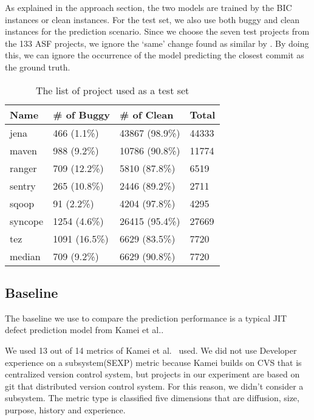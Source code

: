 As explained in the approach section, the two {\simfin} models are trained by the BIC instances or clean instances.
For the test set, we also use both buggy and clean instances for the prediction scenario.
Since we choose the seven test projects from the 133 ASF projects, we ignore the `same' change found as similar by {\simfin}. By doing this, we can ignore the occurrence of the model predicting the closest commit as the ground truth.

\begin{table}[htbp]
\caption{The list of project used as a test set}
\centering
\begin{tabular}{|l|l|l|l|}
\hline
Name & \# of Buggy & \# of Clean & Total \\ \hline
jena & 466 (1.1\%) & 43867 (98.9\%) & 44333 \\ \hline
maven & 988 (9.2\%) & 10786 (90.8\%) & 11774 \\ \hline
ranger & 709 (12.2\%) & 5810 (87.8\%) & 6519 \\ \hline
sentry & 265 (10.8\%) & 2446 (89.2\%) & 2711 \\ \hline
sqoop & 91 (2.2\%) & 4204 (97.8\%) & 4295 \\ \hline
syncope & 1254 (4.6\%) & 26415 (95.4\%) & 27669 \\ \hline
tez & 1091 (16.5\%) & 6629 (83.5\%) & 7720 \\ \hline
median & 709 (9.2\%) & 6629 (90.8\%) &  7720\\ \hline
\end{tabular}%
\newline
\label{tab:test_project}
\end{table}

\subsection{Baseline}
The baseline we use to compare the prediction performance is a typical JIT defect prediction model from Kamei et al.\cite{kamei2012large}.

We used 13 out of 14 metrics of Kamei et al.~\cite{kamei2012large} used. We did not use Developer experience on a subsystem(SEXP) metric because Kamei\cite{kamei2012large} builds on CVS that is centralized version control system, but projects in our experiment are based on git that distributed version control system.
For this reason, we didn't consider a subsystem. The metric type is classified five dimensions that are diffusion, size, purpose, history and experience.

